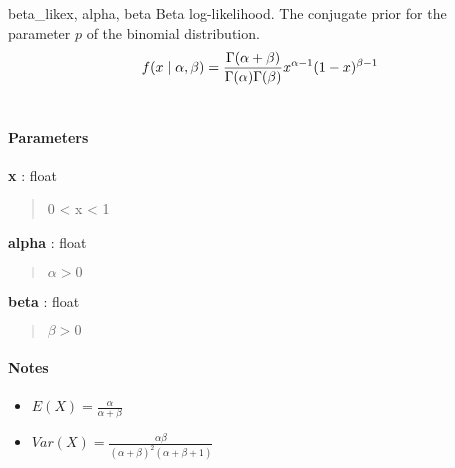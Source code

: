 \hypertarget{pymc.distributions.beta_like}{}
\begin{funcdesc}{beta\_like}{x, alpha, beta}
Beta log-likelihood. The conjugate prior for the parameter $p$ of the binomial distribution.
\begin{gather}
\begin{split}f(x \mid \alpha, \beta) = \frac{\Gamma(\alpha + \beta)}{\Gamma(\alpha) \Gamma(\beta)} x^{\alpha - 1} (1 - x)^{\beta - 1}\end{split}\notag\\\begin{split}\end{split}\notag
\end{gather}
\paragraph{Parameters}
\begin{paramlist}
\item[] \textbf{x} : float
\begin{quote}

0 \textless{} x \textless{} 1
\end{quote}

\item[] \textbf{alpha} : float
\begin{quote}
$\alpha>0$
\end{quote}

\item[] \textbf{beta} : float
\begin{quote}
$\beta>0$
\end{quote}
\end{paramlist}
\paragraph{Notes}
\begin{itemize}
\item {}
$E(X)=\frac{\alpha}{\alpha+\beta}$

\item {}
$Var(X)=\frac{\alpha \beta}{(\alpha+\beta)^2(\alpha+\beta+1)}$

\end{itemize}

\end{funcdesc}

